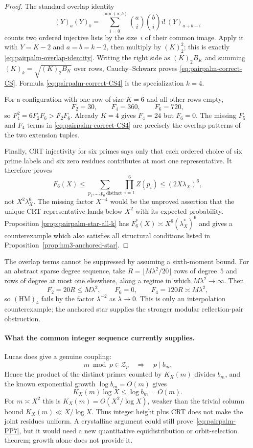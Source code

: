 \begin{proof}
The standard overlap identity
\[
 (Y)_a(Y)_b
 =\sum_{i=0}^{\min(a,b)}\binom ai\binom bi i!\,
   (Y)_{a+b-i}
\]
counts two ordered injective lists by the size~$i$ of their common
image.  Apply it with $Y=K-2$ and $a=b=k-2$, then multiply by
$(K)_2^2$; this is exactly
\eqref{eq:pairpalm-overlap-identity}.  Writing the right side as
$(K)_2B_K$ and summing
$(K)_k=\sqrt{(K)_2B_K}$ over rows, Cauchy--Schwarz proves
\eqref{eq:pairpalm-correct-CS}.  Formula
\eqref{eq:pairpalm-correct-CS4} is the specialization $k=4$.

For a configuration with one row of size $K=6$ and all other rows
empty,
\[
 F_2=30,\qquad F_4=360,\qquad F_6=720,
\]
so $F_4^2=6F_2F_6>F_2F_6$.  Already $K=4$ gives $F_4=24$ but
$F_6=0$.  The missing $F_5$ and $F_4$ terms in
\eqref{eq:pairpalm-correct-CS4} are precisely the overlap patterns of
the two extension tuples.

Finally, CRT injectivity for six primes says only that each ordered
choice of six prime labels and six zero residues contributes at most
one representative.  It therefore proves
\[
 F_6(X)\leq
 \sum_{p_1,\ldots,p_6\ \mathrm{distinct}}
 \prod_{i=1}^6Z(p_i)
 \leq(2X\lambda_X)^6,
\]
not $X^2\lambda_X^6$.  The missing factor $X^{-4}$ would be the
unproved assertion that the unique CRT representative lands below
$X^2$ with its expected probability.  Proposition
\ref{prop:pairpalm-star-all-k} has
$F_6^*(X)\asymp X^6(\lambda_X^*)^6$ and gives a counterexample which
also satisfies all structural conditions listed in
Proposition~\ref{prop:hm3-anchored-star}.
\end{proof}

The overlap terms cannot be suppressed by assuming a sixth-moment bound.
For an abstract sparse degree sequence, take
$R=\lfloor M\lambda^2/20\rfloor$ rows of degree~$5$ and rows of degree at
most one elsewhere, along a regime in which $M\lambda^2\to\infty$.  Then
\[
 F_2=20R\leq M\lambda^2,
 \qquad F_6=0,
 \qquad F_4=120R\asymp M\lambda^2,
\]
so $(\mathrm{HM})_4$ fails by the factor $\lambda^{-2}$ as
$\lambda\to0$.  This is only an interpolation counterexample; the anchored
star supplies the stronger modular reflection-pair obstruction.

\paragraph{What the common integer sequence currently supplies.}
Lucas does give a genuine coupling:
\[
 m\bmod p\in\mathcal Z_p\quad\Longrightarrow\quad p\mid b_m.
\]
Hence the product of the distinct primes counted by $K_X(m)$ divides
$b_m$, and the known exponential growth $\log b_m=O(m)$ gives
\[
 K_X(m)\log X\leq\log b_m=O(m).
\]
For $m\asymp X^2$ this is $K_X(m)=O(X^2/\log X)$, weaker than the
trivial column bound $K_X(m)\ll X/\log X$.  Thus integer height plus
CRT does not make the joint residues uniform.  A crystalline argument
could still prove~\eqref{eq:pairpalm-PP7}, but it would need a new
quantitative equidistribution or orbit-selection theorem; growth alone
does not provide it.

